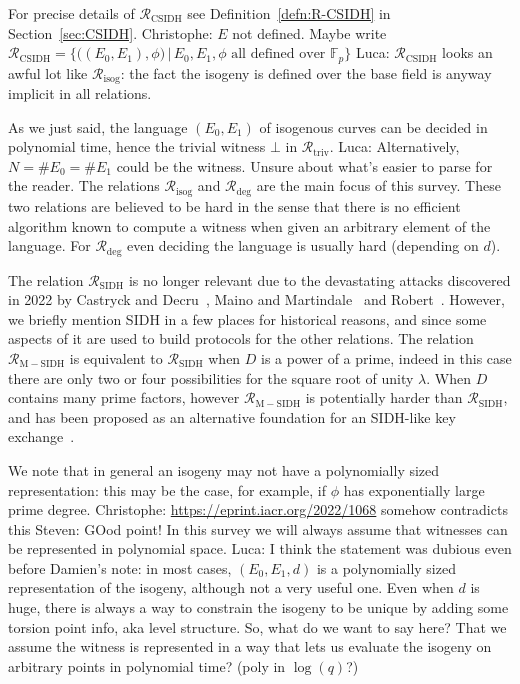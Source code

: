 \documentclass{llncs}
\newcommand{\R}[1][]{\ensuremath{\mathcal{R}_{\mathrm{#1}}}}
\newcommand{\comment}[1]{{\color{gray}#1}}
\newcommand{\CP}[1]{\comment{Christophe: #1}}
\newcommand{\LDF}[1]{\comment{Luca: #1}}
\newcommand{\SG}[1]{\comment{Steven: #1}}
\begin{document}
For precise details of \R[CSIDH] see Definition~\ref{defn:R-CSIDH} in Section~\ref{sec:CSIDH}. \CP{$E$ not defined. Maybe write $\R[CSIDH]  = \bigl\{ \bigl((E_0, E_1),\phi \bigr) \,\big\vert\, E_0,E_1,\phi \text{ all defined over } \mathbb{F}_p\bigr\}$} \LDF{\R[CSIDH] looks an awful lot like \R[isog]: the fact the isogeny is defined over the base field is anyway implicit in all relations.}

As we just said, the language $(E_0,E_1)$ of isogenous curves can be decided in polynomial time, hence the trivial witness $\bot$ in \R[triv].
\LDF{Alternatively, $N = \# E_0 = \# E_1$ could be the witness. Unsure about what's easier to parse for the reader.}
The relations \R[isog] and \R[deg] are the main focus of this survey.
These two relations are believed to be hard in the sense that there is no efficient algorithm known to compute a witness when given an arbitrary element of the language. For $\R[deg]$ even deciding the language is usually hard (depending on $d$).

The relation \R[SIDH] is no longer relevant due to the devastating attacks discovered in 2022 by Castryck and Decru~\cite{CD22}, Maino and Martindale~\cite{MM22} and Robert~\cite{Rob22}. However, we briefly mention SIDH in a few places for historical reasons, and since some aspects of it are used to build protocols for the other relations. The relation \R[M-SIDH] is equivalent to \R[SIDH] when $D$ is a power of a prime, indeed in this case there are only two or four possibilities for the square root of unity $\lambda$. When $D$ contains many prime factors, however \R[M-SIDH] is potentially harder than \R[SIDH], and has been proposed as an alternative foundation for an SIDH-like key exchange~\cite{cryptoeprint:2022/1019,cryptoeprint:2022/1054}.

We note that in general an isogeny may not have a polynomially sized representation: this may be the case, for example, if $\phi$ has exponentially large prime degree. \CP{ \url{https://eprint.iacr.org/2022/1068} somehow contradicts this} \SG{GOod point!} In this survey we will always assume that witnesses can be represented in polynomial space.  \LDF{I think the statement was dubious even before Damien's note: in most cases, $(E_0,E_1,d)$ is a polynomially sized representation of the isogeny, although not a very useful one. Even when $d$ is huge, there is always a way to constrain the isogeny to be unique by adding some torsion point info, aka level structure. So, what do we want to say here? That we assume the witness is represented in a way that lets us evaluate the isogeny on arbitrary points in polynomial time? (poly in $\log(q)$?)}
\end{document}
